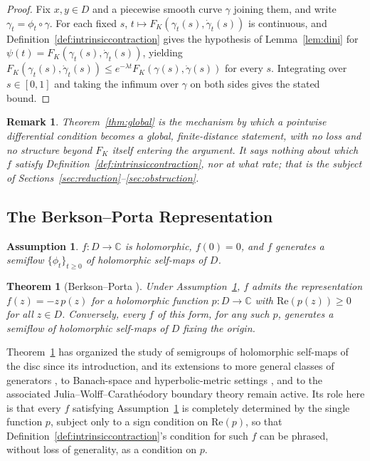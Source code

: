 \documentclass[pdflatex,sn-mathphys-num]{sn-jnl}%
\theoremstyle{thmstyleone}%
\newtheorem{theorem}{Theorem}%
\theoremstyle{thmstyletwo}%
\newtheorem{remark}{Remark}%
\theoremstyle{thmstylethree}%
\newtheorem{assumption}{Assumption}
\begin{document}
\begin{proof}
Fix $x,y\in D$ and a piecewise smooth curve $\gamma$ joining them, and write $\gamma_t=\phi_t\circ\gamma$. For each fixed $s$, $t\mapsto F_K(\gamma_t(s),\dot\gamma_t(s))$ is continuous, and Definition~\ref{def:intrinsiccontraction} gives the hypothesis of Lemma~\ref{lem:dini} for $\psi(t)=F_K(\gamma_t(s),\dot\gamma_t(s))$, yielding $F_K(\gamma_t(s),\dot\gamma_t(s))\le e^{-\lambda t}F_K(\gamma(s),\dot\gamma(s))$ for every $s$. Integrating over $s\in[0,1]$ and taking the infimum over $\gamma$ on both sides gives the stated bound.
\end{proof}

\begin{remark}
Theorem~\ref{thm:global} is the mechanism by which a pointwise differential condition becomes a global, finite-distance statement, with no loss and no structure beyond $F_K$ itself entering the argument. It says nothing about which $f$ satisfy Definition~\ref{def:intrinsiccontraction}, nor at what rate; that is the subject of Sections~\ref{sec:reduction}--\ref{sec:obstruction}.
\end{remark}

\subsection{The Berkson--Porta Representation}
\label{subsec:berksonporta}

\begin{assumption}
\label{ass:fixedpoint}
$f:D\to\mathbb{C}$ is holomorphic, $f(0)=0$, and $f$ generates a semiflow $\{\phi_t\}_{t\ge0}$ of holomorphic self-maps of $D$.
\end{assumption}

\begin{theorem}[Berkson--Porta \cite{berkson1978semigroups}]
\label{thm:berksonporta}
Under Assumption~\ref{ass:fixedpoint}, $f$ admits the representation $f(z)=-z\,p(z)$ for a holomorphic function $p:D\to\mathbb{C}$ with $\mathrm{Re}(p(z))\ge0$ for all $z\in D$. Conversely, every $f$ of this form, for any such $p$, generates a semiflow of holomorphic self-maps of $D$ fixing the origin.
\end{theorem}

Theorem~\ref{thm:berksonporta} has organized the study of semigroups of holomorphic self-maps of the disc since its introduction, and its extensions to more general classes of generators \cite{bracci2007infinitesimal}, to Banach-space and hyperbolic-metric settings \cite{reichshoikhet2005nonlinear}, and to the associated Julia--Wolff--Carath\'eodory boundary theory \cite{elinshoikhet2001dynamic} remain active. Its role here is that every $f$ satisfying Assumption~\ref{ass:fixedpoint} is completely determined by the single function $p$, subject only to a sign condition on $\mathrm{Re}(p)$, so that Definition~\ref{def:intrinsiccontraction}'s condition for such $f$ can be phrased, without loss of generality, as a condition on $p$.
\end{document}
